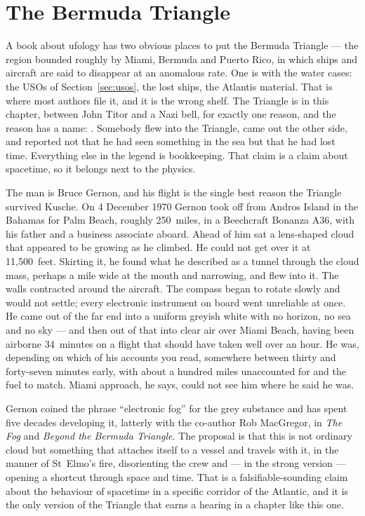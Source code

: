 \section{The Bermuda Triangle}\label{sec:bermudatriangle}

A book about ufology has two obvious places to put the Bermuda Triangle --- the region bounded
roughly by Miami, Bermuda and Puerto Rico, in which ships and aircraft are said to disappear at
an anomalous rate. One is with the water cases: the USOs of Section~\ref{sec:usos}, the lost
ships, the Atlantis material. That is where most authors file it, and it is the wrong shelf. The
Triangle is in this chapter, between John Titor and a Nazi bell, for exactly one reason, and the
reason has a name: . Somebody flew into the Triangle, came out the other
side, and reported not that he had seen something in the sea but that he had lost time.
Everything else in the legend is bookkeeping. That claim is a claim about spacetime, so it belongs
next to the physics.

The man is Bruce Gernon, and his flight is the single best reason the Triangle survived Kusche.
On 4 December 1970 Gernon took off from Andros Island in the Bahamas for Palm Beach, roughly
250~miles, in a Beechcraft Bonanza A36, with his father and a business associate aboard. Ahead
of him sat a lens-shaped cloud that appeared to be growing as he climbed. He could not get over
it at 11,500~feet. Skirting it, he found what he described as a tunnel through the cloud mass,
perhaps a mile wide at the mouth and narrowing, and flew into it. The walls contracted around
the aircraft. The compass began to rotate slowly and would not settle; every electronic
instrument on board went unreliable at once. He came out of the far end into a uniform greyish
white with no horizon, no sea and no sky --- and then out of that into clear air over Miami
Beach, having been airborne 34~minutes on a flight that should have taken well over an hour. He
was, depending on which of his accounts you read, somewhere between thirty and forty-seven
minutes early, with about a hundred miles unaccounted for and the fuel to match. Miami approach,
he says, could not see him where he said he was.

Gernon coined the phrase ``electronic fog'' for the grey substance and has spent five decades
developing it, latterly with the co-author Rob MacGregor, in \emph{The Fog} and \emph{Beyond the
Bermuda Triangle}. The proposal is that this is not ordinary cloud but something that attaches
itself to a vessel and travels with it, in the manner of St~Elmo's fire, disorienting the crew
and --- in the strong version --- opening a shortcut through space and time. That is a
falsifiable-sounding claim about the behaviour of spacetime in a specific corridor of the
Atlantic, and it is the only version of the Triangle that earns a hearing in a chapter like this
one.

